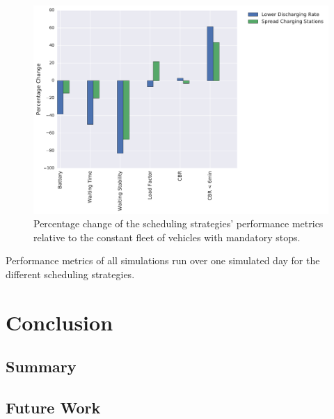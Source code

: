\documentclass[12pt,a4paper]{article}
\begin{document}
\begin{figure}
  \centering
\includegraphics[scale=0.55]{./images/batteryCompare.pdf}
  \caption{Percentage change of the scheduling strategies' performance metrics relative to the constant fleet of vehicles with mandatory stops.}
\label{batterycompare}
\end{figure}

\begin{table}
\center
{}
\caption{Performance metrics of all simulations run over one simulated day for the different scheduling strategies.}
\end{table}

\section{Conclusion}\label{conclusion}
\subsection{Summary}\label{summary}
\subsection{Future Work}\label{futurework}

\newpage


\end{document}
